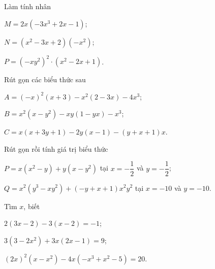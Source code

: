 \begin{bt}%
	Làm tính nhân
	\begin{listEX}[2]
		\item $M=2x(-3x^3+2x-1)$;
		\item $N=(x^2-3x+2)(-x^2)$;
		\item $P=(-xy^2)^2\cdot(x^2-2x+1)$.
	\end{listEX}
\end{bt}
\begin{bt}%
	Rút gọn các biểu thức sau
	\begin{listEX}[1]
		\item $A=(-x)^2(x+3)-x^2(2-3x)-4x^3$; 
		\item $B=x^2(x-y^2)-xy(1-yx)-x^3$; 
		\item $C=x(x+3y+1)-2y(x-1)-(y+x+1)x$. 
	\end{listEX}
\end{bt}
\begin{bt}%
	Rút gọn rồi tính giá trị biểu thức
	\begin{listEX}[1]
		\item $P=x(x^2-y)+y(x-y^2)$ tại $x=-\dfrac{1}{2}$ và $y=-\dfrac{1}{2}$; 
		\item $Q=x^2(y^3-xy^2)+(-y+x+1)x^2y^2$ tại $x=-10$ và $y=-10$. 
	\end{listEX}
\end{bt}
\begin{bt}%
	Tìm $x$, biết
	\begin{listEX}[1]
		\item $2(3x-2)-3(x-2)=-1$; 
		\item $3(3-2x^2)+3x(2x-1)=9$; 
		\item $(2x)^2(x-x^2)-4x(-x^3+x^2-5)=20$. 
	\end{listEX}
\end{bt}
